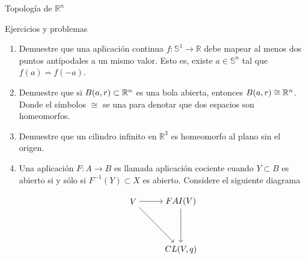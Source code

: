 \begin{chapter}{Topología de $\mathbb{R}^n$}
\begin{section}{Ejercicios y problemas}
\begin{enumerate}
    \item Demuestre que una aplicación continua $f: \mathbb{S}^1 \to \mathbb{R}$ debe mapear al menos dos puntos antípodales a un mismo valor. Esto es, existe $a \in \mathbb{S}^n$ tal que $f(a) = f(-a)$.
    \item Demuestre que si $B(a,r) \subset \mathbb{R}^n$ es una bola abierta, entonces $B(a,r) \cong \mathbb{R}^n$. Donde el símbolos $\cong$ se una para denotar que dos espacios son homeomorfos.
    \item Demuestre que un cilindro infinito en $\mathbb{R}^3$ es homeomorfo al plano sin el origen.
    \item Una aplicación $F: A \to B$ es llamada aplicación cociente cuando $Y \subset B$ es abierto si y sólo si $F^{-1}(Y)\subset X$ es abierto. Considere el siguiente diagrama
    
   
    $$\begin{tikzpicture}[node distance=2cm, auto]
    \node (V) {$V$};
    \node (FAI) [right of= V] {$FAI(V)$};
    \node (CL) [below of= FAI] {$CL(V,q)$};
    \draw[->] (V) to (FAI);%
    \draw[->] (FAI) to (CL);%
    \draw[->] (V) to (CL);%
    \end{tikzpicture}$$


\end{enumerate}
\end{section}
\end{chapter}
